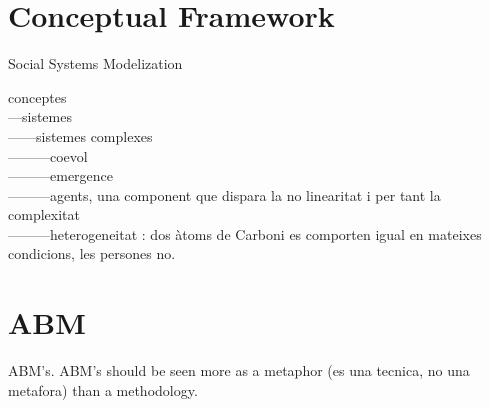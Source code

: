 \documentclass{report}
\begin{document}
\section{Conceptual Framework}{Social Systems Modelization}

conceptes\\
---sistemes\\
------sistemes complexes\\
---------coevol \\
---------emergence\\
---------agents, una component que dispara la no linearitat i per tant la complexitat\\
---------heterogeneitat : dos \`atoms de Carboni es comporten igual en mateixes condicions, les persones no.\\

	\section{ABM}

ABM's. ABM's should be seen more as a metaphor (es una tecnica, no una metafora) than a methodology.
\end{document}
